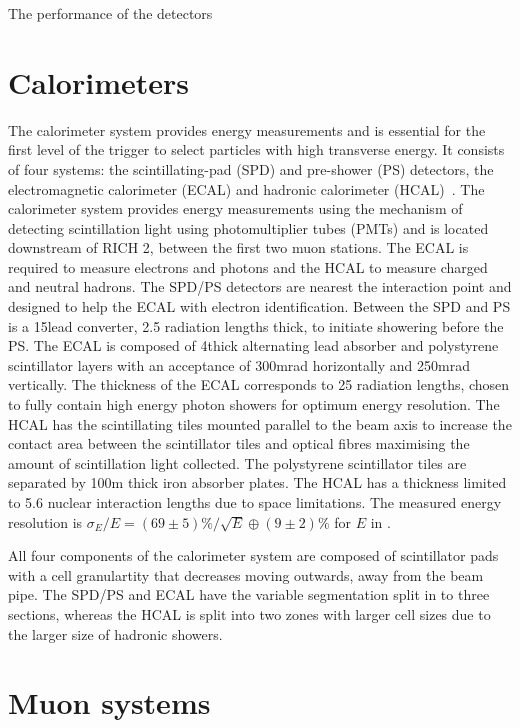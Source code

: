The performance of the \rich detectors


\section{Calorimeters}

The calorimeter system provides energy measurements and is essential for the first level of the trigger to select particles with high transverse energy. It consists of four systems: the scintillating-pad (SPD) and pre-shower (PS) detectors, the electromagnetic calorimeter (ECAL) and hadronic calorimeter (HCAL)~\cite{LHCb-DP-2013-004}. The calorimeter system provides energy measurements using the mechanism of detecting scintillation light using photomultiplier tubes (PMTs) and is located downstream of RICH 2, between the first two muon stations. The ECAL is required to measure electrons and photons and the HCAL to measure charged and neutral hadrons.  The SPD/PS detectors are nearest the interaction point and designed to help the ECAL with electron identification. Between the SPD and PS is a 15\mm lead converter, 2.5 radiation lengths thick, to initiate showering before the PS. The ECAL is composed of 4\mm thick alternating lead absorber and polystyrene scintillator layers with an acceptance of 300mrad horizontally and 250mrad vertically. The thickness of the ECAL corresponds to 25 radiation lengths, chosen to fully contain high energy photon showers for optimum energy resolution. The HCAL has the scintillating tiles mounted parallel to the beam axis to increase the contact area between the scintillator tiles and optical fibres maximising the amount of scintillation light collected. The polystyrene scintillator tiles are separated by 100m thick iron absorber plates. The HCAL has a thickness limited to 5.6 nuclear interaction lengths due to space limitations. The measured energy resolution is $\sigma_E/E = (69 \pm 5)\%/\sqrt{E} \oplus (9 \pm 2)\%$ for $E$ in \gev.

All four components of the calorimeter system are composed of scintillator pads with a cell granulartity that decreases moving outwards, away from the beam pipe. The SPD/PS and ECAL have the variable segmentation split in to three sections, whereas the HCAL is split into two zones with larger cell sizes due to the larger size of hadronic showers.

\section{Muon systems}

